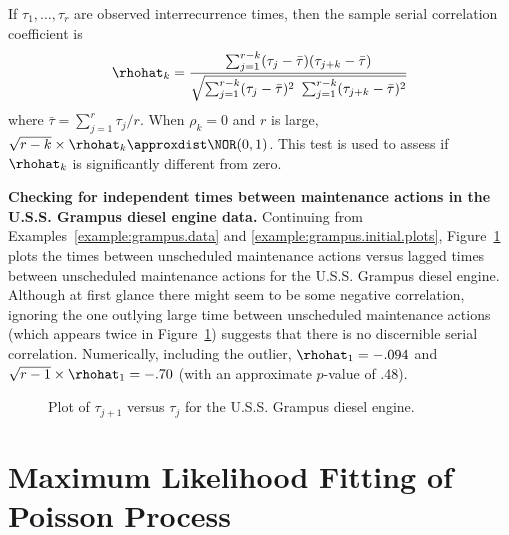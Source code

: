 If $\tau_{1}, \ldots, \tau_{r}$ are observed interrecurrence times,
then the sample serial correlation coefficient is
\begin{displaymath}
\rhohat_{k}=
\frac{
\sum_{j=1}^{r-k} (\tau_{j}-\bar{\tau})
		 (\tau_{j+k}-\bar{\tau})
     }
     {
\sqrt{
\sum_{j=1}^{r-k} (\tau_{j}-\bar{\tau})^{2}
\, \,
\sum_{j=1}^{r-k} (\tau_{j+k}-\bar{\tau})^{2}
     }
     }
\end{displaymath}
where $\bar{\tau}=\sum_{j=1}^{r} \tau_{j}/r$.  When $\rho_{k}=0$ and
$r$ is large, $\sqrt{r-k} \times \rhohat_{k}
\approxdist \NOR(0,1)$. This test is used to 
assess if $\rhohat_{k}$ is significantly different from zero.

\begin{example}
{\bf Checking for independent times between maintenance actions in
the U.S.S.  Grampus diesel engine data.} Continuing from
Examples~\ref{example:grampus.data} and
\ref{example:grampus.initial.plots},
Figure~\ref{figure:grampus.ar1.plot.ps} plots the times between
unscheduled maintenance actions versus lagged times between
unscheduled maintenance actions for the U.S.S. Grampus diesel
engine.  Although at first glance there might seem to be some
negative correlation, ignoring the one outlying large time between
unscheduled maintenance actions (which appears twice in
Figure~\ref{figure:grampus.ar1.plot.ps}) suggests that there is no
discernible serial correlation. Numerically, including the outlier,
$\rhohat_{1}=-.094$ and $\sqrt{r-1} \times \rhohat_{1} = -.70$ (with
an approximate $p$-value of .48).
\begin{figure}
\caption{Plot of $\tau_{j+1}$ versus $\tau_{j}$ for the U.S.S. Grampus diesel 
engine.}
\label{figure:grampus.ar1.plot.ps}
\end{figure}
\end{example}

\section{Maximum Likelihood Fitting of Poisson Process}
\label{section:param.mcf.ml}
